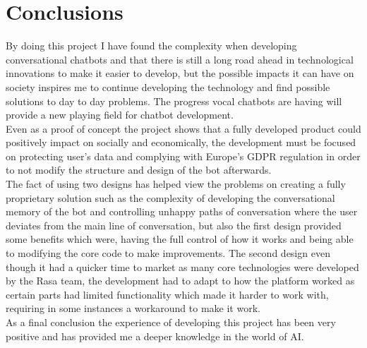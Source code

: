 \chapter{Conclusions}\label{chap:11}

By doing this project I have found the complexity when developing conversational chatbots and that there is still a long road ahead in technological innovations to make it easier to develop, but the possible impacts it can have on society inspires me to continue developing the technology and find possible solutions to day to day problems. The progress vocal chatbots are having will provide a new playing field for chatbot development.\\

Even as a proof of concept the project shows that a fully developed product could positively impact on socially and economically, the development must be focused on protecting user’s data and complying with Europe’s GDPR regulation in order to not modify the structure and design of the bot afterwards.\\

The fact of using two designs has helped view the problems on creating a fully proprietary solution such as the complexity of developing the conversational memory of the bot and controlling unhappy paths of conversation where the user deviates from the main line of conversation, but also the first design provided some benefits which were, having the full control of how it works and being able to modifying the core code to make improvements. The second design even though it had a quicker time to market as many core technologies were developed by the Rasa team, the development had to adapt to how the platform worked as certain parts had limited functionality which made it harder to work with, requiring in some instances a workaround to make it work.\\

As a final conclusion the experience of developing this project has been very positive and has provided me a deeper knowledge in the world of AI.
